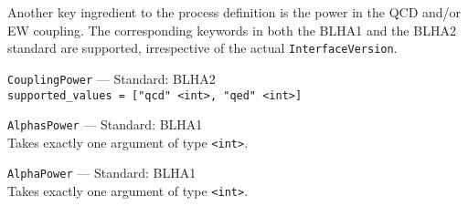 Another key ingredient to the process definition is the power in the QCD and/or EW coupling. The corresponding keywords in both the BLHA1 and the BLHA2 standard are supported, irrespective of the actual \texttt{InterfaceVersion}.
\begin{basedescript}{\desclabelstyle{\pushlabel}}
    \item[\hspace{-1em}]\colorbox{gray!30}{\lstinline[style=in]|CouplingPower|} --- Standard: BLHA2\vspace{0.1cm}\\
        \lstinline[style=in]|supported_values = ["qcd" <int>, "qed" <int>]|
     \item[\hspace{-1em}]\colorbox{gray!30}{\lstinline[style=in]|AlphasPower|} --- Standard: BLHA1\vspace{0.1cm}\\
        Takes exactly one argument of type \texttt{<int>}.
    \item[\hspace{-1em}]\colorbox{gray!30}{\lstinline[style=in]|AlphaPower|} --- Standard: BLHA1\vspace{0.1cm}\\
        Takes exactly one argument of type \texttt{<int>}.
\end{basedescript}

